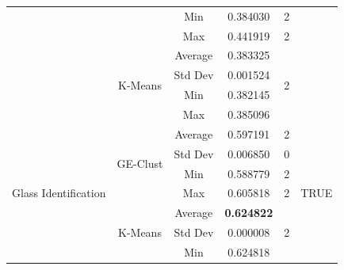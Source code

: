 \documentclass[conference]{IEEEtran}
\begin{document}
\begin{table}[]
\begin{tabular}{|c|c|c|c|c|c|}
			&                               & Min                            & 0.384030                    & 2                        &                       \\ \cline{3-5}
			&                               & Max                            & 0.441919                     & 2                        &                       \\ \cline{2-5}
			& \multirow{4}{*}{K-Means}      & Average                        & 0.383325                    & \multirow{4}{*}{2} &                       \\ \cline{3-4}
			&                               & Std Dev                        & 0.001524                    &                          &                       \\ \cline{3-4}
			&                               & Min                            & 0.382145                    &                          &                       \\ \cline{3-4}
			&                               & Max                            & 0.385096                    &                          &                       \\ \hline
			\multirow{8}{*}{Glass Identification}  & \multirow{4}{*}{GE-Clust}           & Average                        & 0.597191                    & 2                        & \multirow{8}{*}{TRUE} \\ \cline{3-5}
			&                               & Std Dev                        & 0.006850                    & 0                        &                       \\ \cline{3-5}
			&                               & Min                            & 0.588779                    & 2                        &                       \\ \cline{3-5}
			&                               & Max                            & 0.605818                    & 2                        &                       \\ \cline{2-5}
			& \multirow{4}{*}{K-Means}      & Average                        & \textbf{0.624822}                    & \multirow{4}{*}{2} &                       \\ \cline{3-4}
			&                               & Std Dev                        & 0.000008                    &                          &                       \\ \cline{3-4}
			&                               & Min                            & 0.624818                    &                          &                       \\ \cline{3-4}

\end{tabular}
\end{table}
\end{document}
